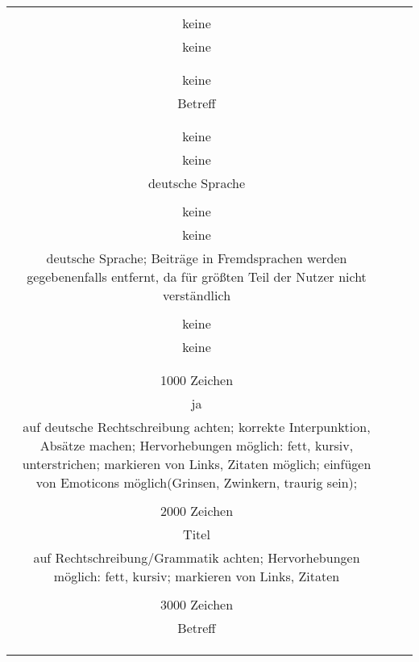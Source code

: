 \begin{landscape}
\begin{tabular}{ccc}
{		&
		\\
		keine\\
		keine\\
		\\
		&%
		\\
		keine\\
		Betreff\\
		\\
		&%
		\\
		keine\\
		keine\\
		deutsche Sprache\\
		&
		\\
		keine\\
		keine\\
		deutsche Sprache; Beiträge in Fremdsprachen werden gegebenenfalls entfernt, da für größten Teil der Nutzer nicht verständlich\\
		&
		\\
		keine\\
		keine\\
		\\
		&
		\\
		1000 Zeichen\\
		ja\\
		auf deutsche Rechtschreibung achten; korrekte Interpunktion, Absätze machen; Hervorhebungen möglich: fett, kursiv, unterstrichen; markieren von Links, Zitaten möglich; einfügen von Emoticons möglich(Grinsen, Zwinkern, traurig sein); \\
		&%
		\\
		2000 Zeichen\\
		Titel\\
		auf Rechtschreibung/Grammatik achten; Hervorhebungen möglich: fett, kursiv; markieren von Links, Zitaten\\
		&
		\\
		3000 Zeichen\\
		Betreff\\
		\\
		&
		\\ \hline
		
}
\end{tabular}
\end{landscape}
